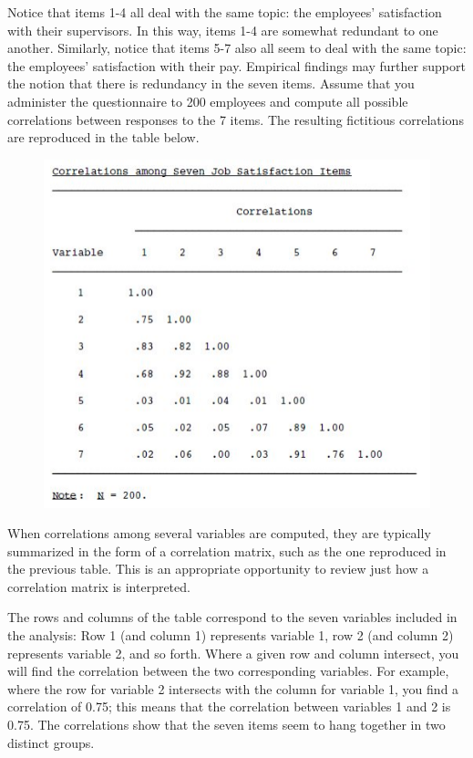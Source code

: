 \documentclass[a4paper,12pt]{article}
\begin{document}
Notice that items 1-4 all deal with the same topic: the employees’ satisfaction with their supervisors. In this way, items 1-4 are somewhat redundant to one another. Similarly, notice that items 5-7 also all seem to deal
with the same topic: the employees’ satisfaction with their pay. Empirical findings may further support the notion that there is redundancy in the seven items. Assume that you administer the questionnaire to 200 employees and compute all possible correlations between responses to the 7 items. The resulting fictitious correlations are
reproduced in the table below.

\begin{figure}
	\centering
	\includegraphics[width=0.7\linewidth]{3Acorrelation}
	\caption{}
	\label{fig:3acorrelation}
\end{figure}


When correlations among several variables are computed, they are typically summarized in the
form of a correlation matrix, such as the one reproduced in the previous table. This is an appropriate
opportunity to review just how a correlation matrix is interpreted.

The rows and columns of the table correspond to the seven variables included in the analysis: Row 1 (and column 1)
represents variable 1, row 2 (and column 2) represents variable 2, and so forth. Where a given
row and column intersect, you will find the correlation between the two corresponding variables.
For example, where the row for variable 2 intersects with the column for variable 1, you find a
correlation of 0.75; this means that the correlation between variables 1 and 2 is 0.75.
The correlations show that the seven items seem to hang together in two distinct
groups.
\end{document}
